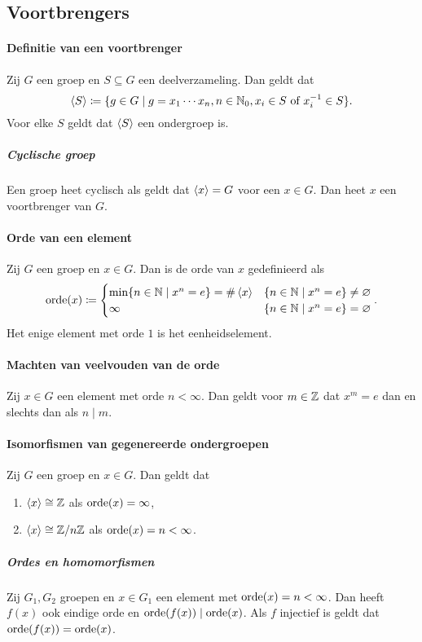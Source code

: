 \subsection{Voortbrengers}
\paragraph{Definitie van een voortbrenger} Zij \(G\) een groep en \(S\subseteq G\) een deelverzameling. Dan geldt dat
\[
    \left\langle S\right\rangle\coloneqq\{g\in G\mid g=x_{1}\cdots x_{n},n\in\mathbb{N}_{0},x_{i}\in S\text{ of }x_{i}^{-1}\in S\}.
\]
Voor elke \(S\) geldt dat \(\left\langle S\right\rangle\) een ondergroep is.

\subparagraph{Cyclische groep} Een groep heet cyclisch als geldt dat \(\left\langle x\right\rangle=G\) voor een \(x\in G\). Dan heet \(x\) een voortbrenger van \(G\).

\paragraph{Orde van een element} Zij \(G\) een groep en \(x\in G\). Dan is de orde van \(x\) gedefinieerd als
\[
    \operatorname{orde}(x)\coloneqq\begin{cases}
        \min\{n\in\mathbb{N}\mid x^{n}=e\}=\#\left\langle x\right\rangle & \{n\in\mathbb{N}\mid x^{n}=e\}\neq\varnothing \\
        \infty                               & \{n\in\mathbb{N}\mid x^{n}=e\}=\varnothing
    \end{cases}.
\]
Het enige element met orde \(1\) is het eenheidselement.

\paragraph{Machten van veelvouden van de orde} Zij \(x\in G\) een element met orde \(n<\infty\). Dan geldt voor \(m\in\mathbb{Z}\) dat \(x^{m}=e\) dan en slechts dan als \(n\mid m\).

\paragraph{Isomorfismen van gegenereerde ondergroepen} Zij \(G\) een groep en \(x\in G\). Dan geldt dat
\begin{enumerate}
    \item \(\left\langle x\right\rangle\cong\mathbb{Z}\) als \(\operatorname{orde}(x)=\infty\),
    \item \(\left\langle x\right\rangle\cong\mathbb{Z}/n\mathbb{Z}\) als \(\operatorname{orde}(x)=n<\infty\).
\end{enumerate}

\subparagraph{Ordes en homomorfismen} Zij \(G_{1},G_{2}\) groepen en \(x\in G_{1}\) een element met \(\operatorname{orde}(x)=n<\infty\). Dan heeft \(f(x)\) ook eindige orde en \(\operatorname{orde}(f(x))\mid\operatorname{orde}(x)\). Als \(f\) injectief is geldt dat \(\operatorname{orde}(f(x))=\operatorname{orde}(x)\).

